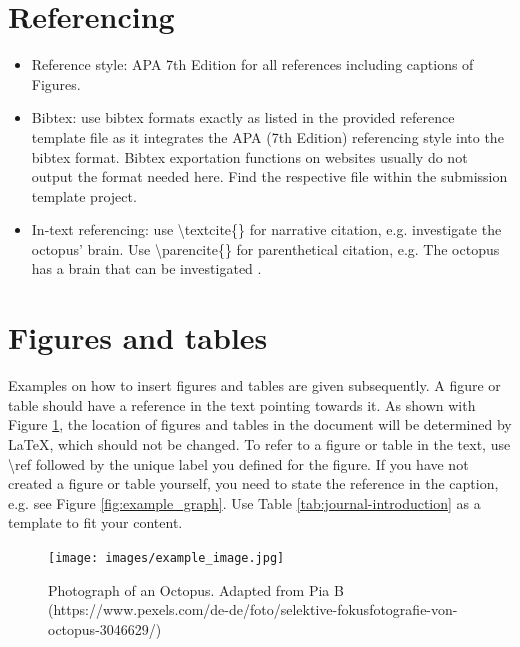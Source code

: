 \documentclass[11pt, twoside]{article}
\newcommand \hex{\small\scaleto{\varhexagonblack}{1.4\LMex}}
\begin{document}
\section{Referencing}
\begin{itemize}
    \item[\hex] Reference style: APA 7th Edition for all references including captions of Figures. 
    \item[\hex] Bibtex: use bibtex formats exactly as listed in the provided reference template file as it integrates the APA (7th Edition) referencing style into the bibtex format. Bibtex exportation functions on websites usually do not output the format needed here. Find the respective file within the submission template project.
    \item[\hex] In-text referencing: use \textbackslash textcite\{\} for narrative citation, e.g. \textcite{Zolotarov2022} investigate the octopus' brain. Use \textbackslash parencite\{\} for parenthetical citation, e.g. The octopus has a brain that can be investigated \parencite{Zolotarov2022}. 
\end{itemize}


\section{Figures and tables}
Examples on how to insert figures and tables are given subsequently. A figure or table should have a reference in the text pointing towards it.
As shown with Figure \ref{fig:example_image}, the location of figures and tables in the document will be determined by LaTeX, which should not be changed. To refer to a figure or table in the text, use \textbackslash ref followed by the unique label you defined for the figure.
If you have not created a figure or table yourself, you need to state the reference in the caption, e.g. see Figure \ref{fig:example_graph}.
Use Table \ref{tab:journal-introduction} as a template to fit your content.

\begin{figure}
    \centering
    \texttt{[image: images/example\_image.jpg]} %
    \caption{Photograph of an Octopus. Adapted from Pia B (https://www.pexels.com/de-de/foto/selektive-fokusfotografie-von-octopus-3046629/)} %
    \label{fig:example_image} %
\end{figure}
\end{document}
